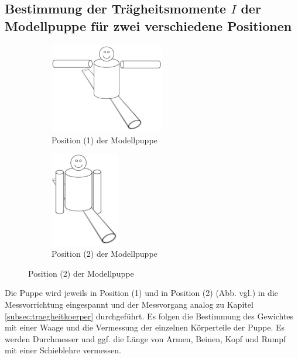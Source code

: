 \subsection{Bestimmung der Trägheitsmomente $I$ der Modellpuppe für zwei verschiedene Positionen}
\begin{figure}[h]
	\centering
	\label{fig:puppe}
	\begin{subfigure}{0.48\textwidth}
		\label{fig:puppe1}
		\centering
		\includegraphics[width=5cm]{Bilder/puppe1.pdf}
		\caption{Position (1) der Modellpuppe}
	\end{subfigure}
	\begin{subfigure}{0.48\textwidth}
		\label{fig:puppe2}
		\centering
		\includegraphics[width=3cm]{Bilder/puppe2.pdf}
		\caption{Position (2) der Modellpuppe}
	\end{subfigure}
\end{figure}
\noindent Die Puppe wird jeweils in Position (1) und in Position (2) (Abb. vgl.\cite{V101}) in die Messvorrichtung eingespannt und 
der Messvorgang analog zu Kapitel \ref{subsec:traegheitkoerper} durchgeführt. 
Es folgen die Bestimmung des Gewichtes mit einer Waage und die Vermessung der einzelnen Körperteile der Puppe. 
Es werden Durchmesser und ggf. die Länge von Armen, Beinen, Kopf und Rumpf mit einer Schieblehre vermessen.

